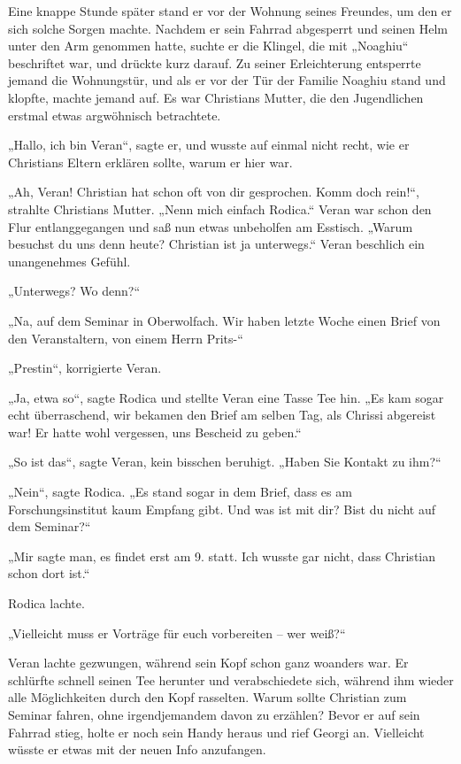 \documentclass[oneside]{memoir}
\begin{document}
Eine knappe Stunde später stand er vor der Wohnung seines Freundes, um den er sich solche Sorgen machte. Nachdem er sein Fahrrad abgesperrt und seinen Helm unter den Arm genommen hatte, suchte er die Klingel, die mit „Noaghiu“ beschriftet war, und drückte kurz darauf. Zu seiner Erleichterung entsperrte jemand die Wohnungstür, und als er vor der Tür der Familie Noaghiu stand und klopfte, machte jemand auf. Es war Christians Mutter, die den Jugendlichen erstmal etwas argwöhnisch betrachtete.

„Hallo, ich bin Veran“, sagte er, und wusste auf einmal nicht recht, wie er Christians Eltern erklären sollte, warum er hier war.

„Ah, Veran! Christian hat schon oft von dir gesprochen. Komm doch rein!“, strahlte Christians Mutter. „Nenn mich einfach Rodica.“ Veran war schon den Flur entlanggegangen und saß nun etwas unbeholfen am Esstisch. „Warum besuchst du uns denn heute? Christian ist ja unterwegs.“
Veran beschlich ein unangenehmes Gefühl.

„Unterwegs? Wo denn?“

„Na, auf dem Seminar in Oberwolfach. Wir haben letzte Woche einen Brief von den Veranstaltern, von einem Herrn Prits-“

„Prestin“, korrigierte Veran.

„Ja, etwa so“, sagte Rodica und stellte Veran eine Tasse Tee hin. „Es kam sogar echt überraschend, wir bekamen den Brief am selben Tag, als Chrissi abgereist war! Er hatte wohl vergessen, uns Bescheid zu geben.“

„So ist das“, sagte Veran, kein bisschen beruhigt. „Haben Sie Kontakt zu ihm?“

„Nein“, sagte Rodica. „Es stand sogar in dem Brief, dass es am Forschungsinstitut kaum Empfang gibt. Und was ist mit dir? Bist du nicht auf dem Seminar?“

„Mir sagte man, es findet erst am 9. statt. Ich wusste gar nicht, dass Christian schon dort ist.“

Rodica lachte.

„Vielleicht muss er Vorträge für euch vorbereiten – wer weiß?“

Veran lachte gezwungen, während sein Kopf schon ganz woanders war. Er schlürfte schnell seinen Tee herunter und verabschiedete sich, während ihm wieder alle Möglichkeiten durch den Kopf rasselten. Warum sollte Christian zum Seminar fahren, ohne irgendjemandem davon zu erzählen? Bevor er auf sein Fahrrad stieg, holte er noch sein Handy heraus und rief Georgi an. Vielleicht wüsste er etwas mit der neuen Info anzufangen.
\end{document}
